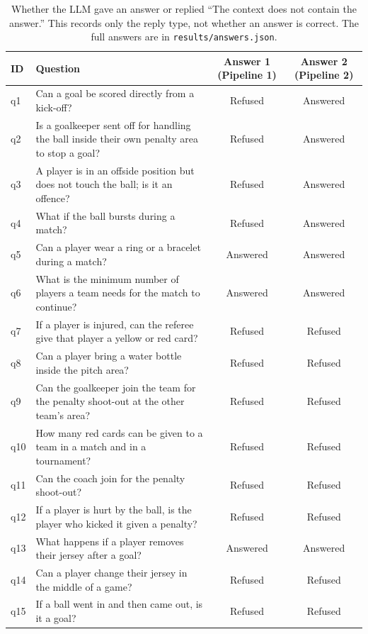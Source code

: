 \documentclass[11pt,a4paper]{article}
\begin{document}
\begin{table}[H]
\centering
\footnotesize
\renewcommand{\arraystretch}{1.15}
\begin{tabularx}{\textwidth}{@{}l X c c@{}}
\toprule
ID & Question & Answer 1 (Pipeline 1) & Answer 2 (Pipeline 2) \\
\midrule
q1 & Can a goal be scored directly from a kick-off? & Refused & Answered \\
q2 & Is a goalkeeper sent off for handling the ball inside their own penalty area to stop a goal? & Refused & Answered \\
q3 & A player is in an offside position but does not touch the ball; is it an offence? & Refused & Answered \\
q4 & What if the ball bursts during a match? & Refused & Answered \\
q5 & Can a player wear a ring or a bracelet during a match? & Answered & Answered \\
q6 & What is the minimum number of players a team needs for the match to continue? & Answered & Answered \\
q7 & If a player is injured, can the referee give that player a yellow or red card? & Refused & Refused \\
q8 & Can a player bring a water bottle inside the pitch area? & Refused & Refused \\
q9 & Can the goalkeeper join the team for the penalty shoot-out at the other team's area? & Refused & Refused \\
q10 & How many red cards can be given to a team in a match and in a tournament? & Refused & Refused \\
q11 & Can the coach join for the penalty shoot-out? & Refused & Refused \\
q12 & If a player is hurt by the ball, is the player who kicked it given a penalty? & Refused & Refused \\
q13 & What happens if a player removes their jersey after a goal? & Answered & Answered \\
q14 & Can a player change their jersey in the middle of a game? & Refused & Refused \\
q15 & If a ball went in and then came out, is it a goal? & Refused & Refused \\
\bottomrule
\end{tabularx}
\caption{Whether the LLM gave an answer or replied ``The context does not contain the answer.'' This records only the reply type, not whether an answer is correct. The full answers are in \texttt{results/answers.json}.}
\label{tab:answers}
\end{table}
\end{document}
